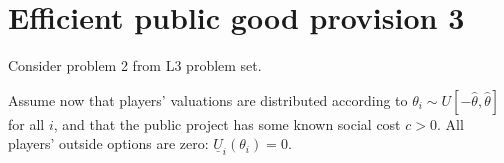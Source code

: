 \documentclass[a4paper]{article}
\begin{document}
%		
%		 
%		
%		



\section{Efficient public good provision 3}

Consider problem 2 from L3 problem set.

Assume now that players' valuations are distributed according to $\theta_i \sim U[-\hat{\theta},\hat{\theta}]$ for all $i$, and that the public project has some known social cost $c > 0$. 
All players' outside options are zero: $\underline{U}_i(\theta_i)=0$.
\end{document}
